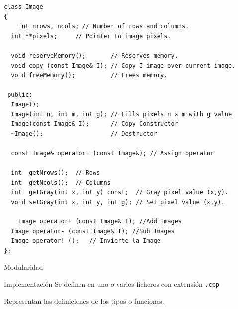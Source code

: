 \documentclass[aspectratio=169,presentation]{beamer}
\begin{document}
\begin{frame}[label={sec:orge0ec134},fragile]{}
 \begin{verbatim}
class Image
{
	int nrows, ncols; // Number of rows and columns.
  int **pixels;     // Pointer to image pixels.

  void reserveMemory();       // Reserves memory.
  void copy (const Image& I); // Copy I image over current image.
  void freeMemory();          // Frees memory.

 public:
  Image();
  Image(int n, int m, int g); // Fills pixels n x m with g value
  Image(const Image& I);      // Copy Constructor
  ~Image();                   // Destructor

  const Image& operator= (const Image&); // Assign operator

  int  getNrows();  // Rows
  int  getNcols();  // Columns
  int  getGray(int x, int y) const;  // Gray pixel value (x,y).
  void setGray(int x, int y, int g); // Set pixel value (x,y).

	Image operator+ (const Image& I); //Add Images
  Image operator- (const Image& I); //Sub Images
  Image operator! ();   // Invierte la Image
};
\end{verbatim}
\end{frame}
\begin{frame}[label={sec:orge977b4a},fragile]{Modularidad}
 \begin{block}{Implementación}
Se definen en uno o varios ficheros con extensión \texttt{.cpp}

Representan las definiciones de los tipos o funciones.
\end{block}
\end{frame}
\end{document}
